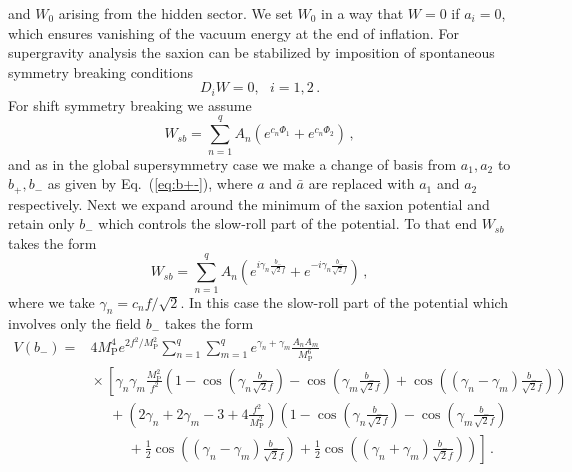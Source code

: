 \documentclass[11pt]{article}
\begin{document}
and $W_0$ arising from the hidden sector. We set $W_0$ in a way that $W = 0$ if $a_i = 0$, which ensures vanishing of the vacuum energy at the end of inflation.
For supergravity analysis the saxion can be stabilized by imposition of spontaneous symmetry breaking conditions~\cite{Nath:1983aw}
\begin{equation}
  D_i W = 0,
  ~~~ i = 1, 2\,.
\end{equation}
For shift symmetry breaking we assume
\begin{equation}
  W_{sb} = \sum_{n = 1}^q A_n \left(e^{c_n \Phi_1} + e^{c_n \Phi_2}\right)\,,
\end{equation}
and as in the global supersymmetry case we make a change of basis from $a_1, a_2$ to $b_+, b_-$ as given by Eq.~(\ref{eq:b+-}), where $a$ and $\bar a$ are replaced with $a_1$ and $a_2$ respectively.
Next we expand around the minimum of the saxion potential and retain only $b_-$ which controls the slow-roll part of the potential.
To that end $W_{sb}$ takes the form
\begin{equation}
  W_{sb} = \sum_{n = 1}^q A_n \left(
      e^{i \gamma_n \frac{b_-}{\sqrt{2} f}}
    + e^{-i \gamma_n \frac{b_-}{\sqrt{2} f}}
  \right)\,,
\end{equation}
where we take $\gamma_n = c_n f / \sqrt{2}$.
In this case the slow-roll part of the potential which involves only the field $b_-$ takes the form
\begin{equation} \label{eq:supergravity:Vslow}
  \begin{aligned}
    V\left(b_-\right) =
      & 4 M_\text{P}^4 e^{2 f^2 / M_\text{P}^2} \sum_{n = 1}^q \sum_{m = 1}^q
        e^{\gamma_n + \gamma_m} \frac{A_n A_m}{M_\text{P}^6}\\
        &{} \times \left[
          \gamma_n \gamma_m \frac{M_\text{P}^2}{f^2} \left(
              1
            - \cos\left(\gamma_n \frac{b_-}{\sqrt{2} f}\right)
            - \cos\left(\gamma_m \frac{b_-}{\sqrt{2} f}\right)
            + \cos\left(\left(\gamma_n - \gamma_m\right) \frac{b_-}{\sqrt{2} f}\right)
          \right)\right.\\
          &~~~~~~ + \left(2 \gamma_n + 2 \gamma_m - 3 + 4 \frac{f^2}{M_\text{P}^2}\right) \left(
              1
            - \cos\left(\gamma_n \frac{b_-}{\sqrt{2} f}\right)
            - \cos\left(\gamma_m \frac{b_-}{\sqrt{2} f}\right)\right.\\
            &~~~~~~~~~~~~ \left.\left.{}
            + \frac{1}{2} \cos\left(\left(\gamma_n - \gamma_m\right) \frac{b_-}{\sqrt{2} f}\right)
            + \frac{1}{2} \cos\left(\left(\gamma_n + \gamma_m\right) \frac{b_-}{\sqrt{2} f}\right)
          \right)
        \right]\,.
  \end{aligned}
\end{equation}
\end{document}
